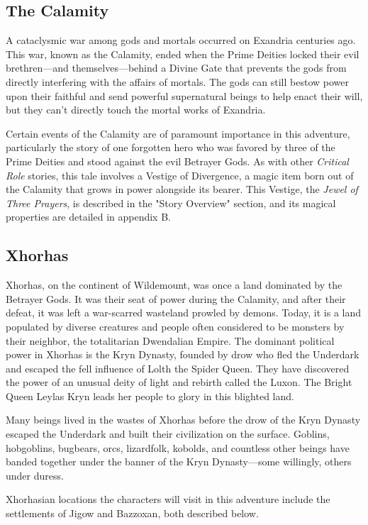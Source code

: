 \documentclass[10pt,a4paper,twoside,fancy,bg=print,twocolumn,openany,nodeprecatedcode]{dndbook}
\begin{document}
\subsection{The Calamity}
A cataclysmic war among gods and mortals occurred on Exandria centuries ago. This war, known as the Calamity, ended when the Prime Deities locked their evil brethren—and themselves—behind a Divine Gate that prevents the gods from directly interfering with the affairs of mortals. The gods can still bestow power upon their faithful and send powerful supernatural beings to help enact their will, but they can't directly touch the mortal works of Exandria.

Certain events of the Calamity are of paramount importance in this adventure, particularly the story of one forgotten hero who was favored by three of the Prime Deities and stood against the evil Betrayer Gods. As with other \textit{Critical Role} stories, this tale involves a Vestige of Divergence, a magic item born out of the Calamity that grows in power alongside its bearer. This Vestige, the \textit{Jewel of Three Prayers}, is described in the "Story Overview" section, and its magical properties are detailed in appendix B.

\subsection{Xhorhas}
Xhorhas, on the continent of Wildemount, was once a land dominated by the Betrayer Gods. It was their seat of power during the Calamity, and after their defeat, it was left a war-scarred wasteland prowled by demons. Today, it is a land populated by diverse creatures and people often considered to be monsters by their neighbor, the totalitarian Dwendalian Empire. The dominant political power in Xhorhas is the Kryn Dynasty, founded by drow who fled the Underdark and escaped the fell influence of Lolth the Spider Queen. They have discovered the power of an unusual deity of light and rebirth called the Luxon. The Bright Queen Leylas Kryn leads her people to glory in this blighted land.

Many beings lived in the wastes of Xhorhas before the drow of the Kryn Dynasty escaped the Underdark and built their civilization on the surface. Goblins, hobgoblins, bugbears, orcs, lizardfolk, kobolds, and countless other beings have banded together under the banner of the Kryn Dynasty—some willingly, others under duress.

Xhorhasian locations the characters will visit in this adventure include the settlements of Jigow and Bazzoxan, both described below.
\end{document}
